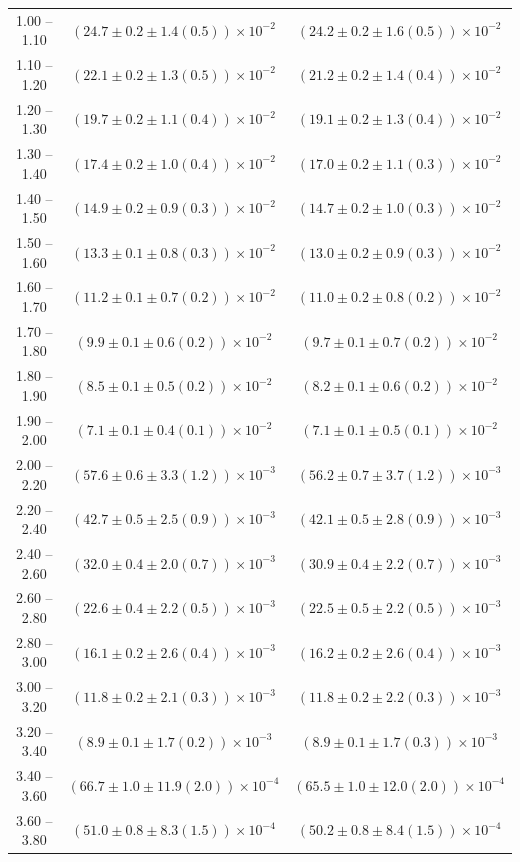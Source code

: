 \begin{table}
\begin{center}
\begin{tabular}{ c | c c }
1.00 -- 1.10 & $(24.7\pm0.2\pm1.4(0.5))\times10^{-2}$ & $(24.2\pm0.2\pm1.6(0.5))\times10^{-2}$ \\ 
1.10 -- 1.20 & $(22.1\pm0.2\pm1.3(0.5))\times10^{-2}$ & $(21.2\pm0.2\pm1.4(0.4))\times10^{-2}$ \\ 
1.20 -- 1.30 & $(19.7\pm0.2\pm1.1(0.4))\times10^{-2}$ & $(19.1\pm0.2\pm1.3(0.4))\times10^{-2}$ \\ 
1.30 -- 1.40 & $(17.4\pm0.2\pm1.0(0.4))\times10^{-2}$ & $(17.0\pm0.2\pm1.1(0.3))\times10^{-2}$ \\ 
1.40 -- 1.50 & $(14.9\pm0.2\pm0.9(0.3))\times10^{-2}$ & $(14.7\pm0.2\pm1.0(0.3))\times10^{-2}$ \\ 
1.50 -- 1.60 & $(13.3\pm0.1\pm0.8(0.3))\times10^{-2}$ & $(13.0\pm0.2\pm0.9(0.3))\times10^{-2}$ \\ 
1.60 -- 1.70 & $(11.2\pm0.1\pm0.7(0.2))\times10^{-2}$ & $(11.0\pm0.2\pm0.8(0.2))\times10^{-2}$ \\ 
1.70 -- 1.80 & $(9.9\pm0.1\pm0.6(0.2))\times10^{-2}$ & $(9.7\pm0.1\pm0.7(0.2))\times10^{-2}$ \\ 
1.80 -- 1.90 & $(8.5\pm0.1\pm0.5(0.2))\times10^{-2}$ & $(8.2\pm0.1\pm0.6(0.2))\times10^{-2}$ \\ 
1.90 -- 2.00 & $(7.1\pm0.1\pm0.4(0.1))\times10^{-2}$ & $(7.1\pm0.1\pm0.5(0.1))\times10^{-2}$ \\ 
2.00 -- 2.20 & $(57.6\pm0.6\pm3.3(1.2))\times10^{-3}$ & $(56.2\pm0.7\pm3.7(1.2))\times10^{-3}$ \\ 
2.20 -- 2.40 & $(42.7\pm0.5\pm2.5(0.9))\times10^{-3}$ & $(42.1\pm0.5\pm2.8(0.9))\times10^{-3}$ \\ 
2.40 -- 2.60 & $(32.0\pm0.4\pm2.0(0.7))\times10^{-3}$ & $(30.9\pm0.4\pm2.2(0.7))\times10^{-3}$ \\ 
2.60 -- 2.80 & $(22.6\pm0.4\pm2.2(0.5))\times10^{-3}$ & $(22.5\pm0.5\pm2.2(0.5))\times10^{-3}$ \\ 
2.80 -- 3.00 & $(16.1\pm0.2\pm2.6(0.4))\times10^{-3}$ & $(16.2\pm0.2\pm2.6(0.4))\times10^{-3}$ \\ 
3.00 -- 3.20 & $(11.8\pm0.2\pm2.1(0.3))\times10^{-3}$ & $(11.8\pm0.2\pm2.2(0.3))\times10^{-3}$ \\ 
3.20 -- 3.40 & $(8.9\pm0.1\pm1.7(0.2))\times10^{-3}$ & $(8.9\pm0.1\pm1.7(0.3))\times10^{-3}$ \\ 
3.40 -- 3.60 & $(66.7\pm1.0\pm11.9(2.0))\times10^{-4}$ & $(65.5\pm1.0\pm12.0(2.0))\times10^{-4}$ \\ 
3.60 -- 3.80 & $(51.0\pm0.8\pm8.3(1.5))\times10^{-4}$ & $(50.2\pm0.8\pm8.4(1.5))\times10^{-4}$ \\ 

\end{tabular}
\end{center}
\end{table}
